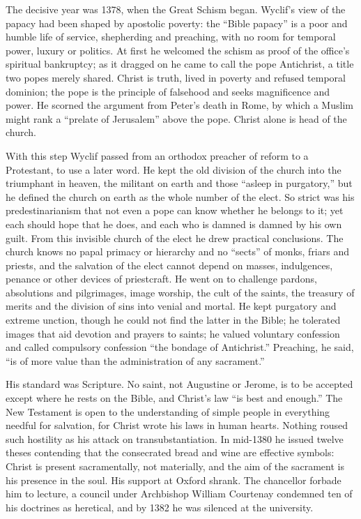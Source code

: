 The decisive year was 1378, when the Great Schism began. Wyclif's view of the papacy had been shaped
by apostolic poverty: the ``Bible papacy'' is a poor and humble life of service, shepherding and
preaching, with no room for temporal power, luxury or politics. At first he welcomed the schism as
proof of the office's spiritual bankruptcy; as it dragged on he came to call the pope Antichrist, a
title two popes merely shared. Christ is truth, lived in poverty and refused temporal dominion; the
pope is the principle of falsehood and seeks magnificence and power. He scorned the argument from
Peter's death in Rome, by which a Muslim might rank a ``prelate of Jerusalem'' above the pope. Christ
alone is head of the church.

With this step Wyclif passed from an orthodox preacher of reform to a Protestant, to use a later
word. He kept the old division of the church into the triumphant in heaven, the militant on earth and
those ``asleep in purgatory,'' but he defined the church on earth as the whole number of the elect.
So strict was his predestinarianism that not even a pope can know whether he belongs to it; yet each
should hope that he does, and each who is damned is damned by his own guilt. From this invisible
church of the elect he drew practical conclusions. The church knows no papal primacy or hierarchy
and no ``sects'' of monks, friars and priests, and the salvation of the elect cannot depend on
masses, indulgences, penance or other devices of priestcraft. He went on to challenge pardons,
absolutions and pilgrimages, image worship, the cult of the saints, the treasury of merits and the division of sins into venial and mortal. He kept purgatory and extreme unction, though he
could not find the latter in the Bible; he tolerated images that aid devotion and prayers to saints;
he valued voluntary confession and called compulsory confession ``the bondage of Antichrist.''
Preaching, he said, ``is of more value than the administration of any sacrament.''

His standard was Scripture. No saint, not Augustine or Jerome, is to be accepted except where he
rests on the Bible, and Christ's law ``is best and enough.'' The New Testament is open to the
understanding of simple people in everything needful for salvation, for Christ wrote his laws in
human hearts. Nothing roused such hostility as his attack on transubstantiation. In mid-1380 he issued twelve theses contending that the consecrated bread and wine are effective symbols: Christ is
present sacramentally, not materially, and the aim of the sacrament is his presence in the soul. His
support at Oxford shrank. The chancellor forbade him to lecture, a council under Archbishop William
Courtenay condemned ten of his doctrines as heretical, and by 1382 he was silenced at the university.

